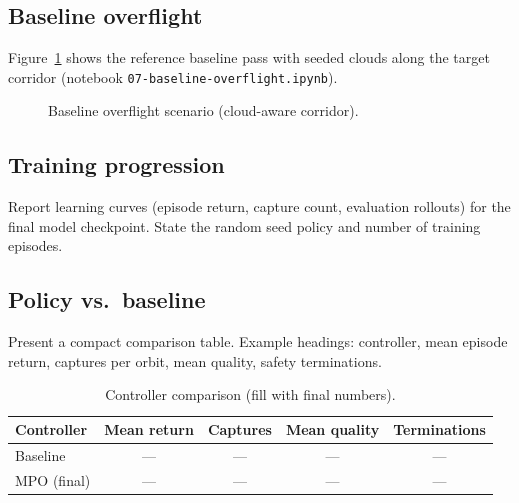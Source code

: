 \label{sec:results}


\subsection{Baseline overflight}
Figure~\ref{fig:baseline-overflight} shows the reference baseline pass with seeded clouds along the target corridor (notebook \texttt{07-baseline-overflight.ipynb}).

\begin{figure}[htbp]
  \centering
  \caption{Baseline overflight scenario (cloud-aware corridor).}
  \label{fig:baseline-overflight}
\end{figure}

\subsection{Training progression}
Report learning curves (episode return, capture count, evaluation rollouts) for the final model checkpoint.
State the random seed policy and number of training episodes.

\subsection{Policy vs.\ baseline}
Present a compact comparison table.
Example headings: controller, mean episode return, captures per orbit, mean quality, safety terminations.

\begin{table}[htbp]
  \centering
  \caption{Controller comparison (fill with final numbers).}
  \label{tab:controller-comparison}
  \begin{tabular}{lcccc}
    \toprule
    Controller & Mean return & Captures & Mean quality & Terminations \\
    \midrule
    Baseline   & --- & --- & --- & --- \\
    MPO (final)& --- & --- & --- & --- \\
    \bottomrule
  \end{tabular}
\end{table}
